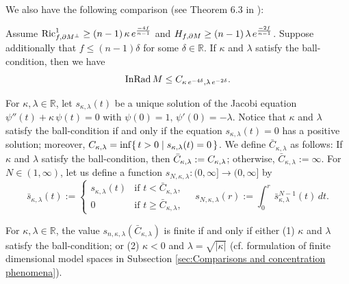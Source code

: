 We also have the following comparison (see Theorem 6.3 in \cite{S2}):
\begin{thm}[\cite{S2}]\label{thm:twisted inscribed radius comparison}
Assume
$\operatorname{Ric}^{1}_{f,\partial M^{\perp}}\geq (n-1) \,\kappa \,e^{\frac{-4f}{n-1}}$ and $H_{f,\partial M}\geq (n-1)\,\lambda\,e^{\frac{-2f}{n-1}}$.
Suppose additionally that
$f\leq (n-1)\delta$ for some $\delta \in \mathbb{R}$.
If $\kappa$ and $\lambda$ satisfy the ball-condition,
then we have
\begin{equation*}
\operatorname{InRad} M \leq C_{\kappa\,e^{-4\delta},\lambda\,e^{-2\delta}}.
\end{equation*}
\end{thm}

For $\kappa,\lambda \in \mathbb{R}$,
let $s_{\kappa,\lambda}(t)$ be a unique solution of the Jacobi equation $\psi''(t)+\kappa\, \psi(t)=0$ with $\psi(0)=1,\,\psi'(0)=-\lambda$.
Notice that
$\kappa$ and $\lambda$ satisfy the ball-condition if and only if
the equation $s_{\kappa,\lambda}(t)=0$ has a positive solution;
moreover,
$C_{\kappa,\lambda}=\inf \{\,t>0 \mid s_{\kappa,\lambda}(t)=0\, \}$.
We define $\bar{C}_{\kappa,\lambda}$ as follows:
If $\kappa$ and $\lambda$ satisfy the ball-condition,
then $\bar{C}_{\kappa,\lambda}:=C_{\kappa,\lambda}$;
otherwise,
$\bar{C}_{\kappa,\lambda}:=\infty$.
For $N\in (1,\infty)$,
let us define a function $s_{N,\kappa,\lambda}:(0,\infty]\to (0,\infty]$ by
\begin{equation}\label{eq:one dimensional volume growth}
\bar{s}_{\kappa,\lambda}(t) := \begin{cases}
                                            s_{\kappa,\lambda}(t) & \text{if $t< \bar{C}_{\kappa,\lambda}$},\\
                                            0                     & \text{if $t\geq    \bar{C}_{\kappa,\lambda}$},
                                 \end{cases}
                                 \quad s_{N,\kappa,\lambda}(r):=\int^{r}_{0}\, \bar{s}^{N-1}_{\kappa,\lambda}(t)\,dt.
\end{equation}

\begin{rem}\label{rem:formulation of finite dimensional model spaces}
For $\kappa,\lambda\in \mathbb{R}$,
the value $s_{n,\kappa,\lambda}(\bar{C}_{\kappa,\lambda})$ is finite if and only if
either (1) $\kappa$ and $\lambda$ satisfy the ball-condition;
or (2) $\kappa<0$ and $\lambda=\sqrt{\vert \kappa \vert}$ (cf. formulation of finite dimensional model spaces in Subsection \ref{sec:Comparisons and concentration phenomena}).
\end{rem}

